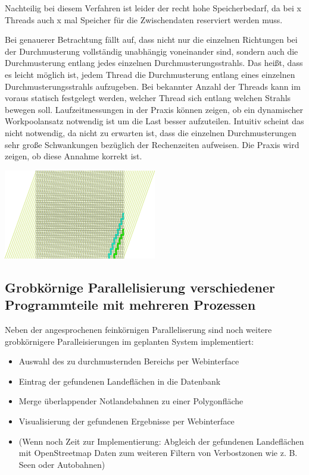 \documentclass[
11pt, %
a4paper, %
oneside, %
pdfspacing, %
headinclude,
BCOR5mm, %
ngerman, %
bibtotocnumbered,
]{scrartcl}
\begin{document}
Nachteilig bei diesem Verfahren ist leider der recht hohe Speicherbedarf, da bei x Threads auch x mal Speicher für die Zwischendaten reserviert werden muss.

\skippingparagraph

Bei genauerer Betrachtung fällt auf, dass nicht nur die einzelnen Richtungen bei der Durchmusterung vollständig unabhängig voneinander sind, sondern auch die Durchmusterung entlang jedes einzelnen Durchmusterungsstrahls. Das heißt, dass es leicht möglich ist, jedem Thread die Durchmusterung entlang eines einzelnen Durchmusterungsstrahls aufzugeben. Bei bekannter Anzahl der Threads kann im voraus statisch festgelegt werden, welcher Thread sich entlang welchen Strahls bewegen soll. Laufzeitmessungen in der Praxis können zeigen, ob ein dynamischer Workpoolansatz notwendig ist um die Last besser aufzuteilen. Intuitiv scheint das nicht notwendig, da nicht zu erwarten ist, dass die einzelnen Durchmusterungen sehr große Schwankungen bezüglich der Rechenzeiten aufweisen. Die Praxis wird zeigen, ob diese Annahme korrekt ist.

	\includegraphics[width=0.5\textwidth]{./drawings/Durchmusterungspfade_schraeg.png}

\subsection{Grobkörnige Parallelisierung verschiedener Programmteile mit mehreren Prozessen}
Neben der angesprochenen feinkörnigen Paralleliserung sind noch weitere grobkörnigere Paralleisierungen im geplanten System implementiert:
\begin{itemize}
	\item Auswahl des zu durchmusternden Bereichs per Webinterface
	\item Eintrag der gefundenen Landeflächen in die Datenbank 
	\item Merge überlappender Notlandebahnen zu einer Polygonfläche
	\item Visualisierung der gefundenen Ergebnisse per Webinterface
	\item (Wenn noch Zeit zur Implementierung: Abgleich der gefundenen Landeflächen mit OpenStreetmap Daten zum weiteren Filtern von Verbostzonen wie z. B. Seen oder Autobahnen)
\end{itemize}
\end{document}

